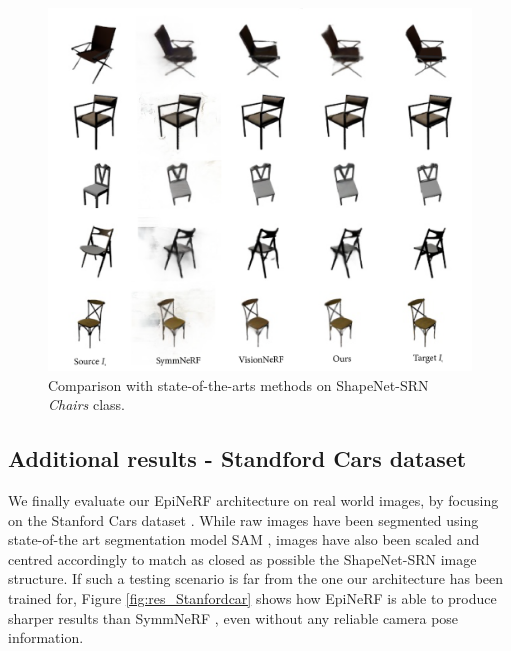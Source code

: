 \begin{figure}[h!]
    \begin{center}
  \includegraphics[width=\linewidth]{images/epinerf/supp_Chairs_additional_inference.png}
  \caption{Comparison with state-of-the-arts methods on ShapeNet-SRN \textit{Chairs} class.}
  \label{fig:supp_chairs}
  \end{center}
\end{figure}

\clearpage

\subsection{Additional results - Standford Cars dataset }
We finally evaluate our EpiNeRF architecture on real world images, by focusing on the Stanford Cars dataset \citep{krause20133d}. While raw images have been segmented using state-of-the art segmentation model SAM \citep{kirillov2023segment}, images have also been scaled and centred accordingly to match as closed as possible the ShapeNet-SRN image structure. If such a testing scenario is far from the one our architecture has been trained for, Figure \ref{fig:res_Stanfordcar} shows how EpiNeRF is able to produce sharper results than SymmNeRF \citep{li2022symmnerf}, even without any reliable camera pose information.


